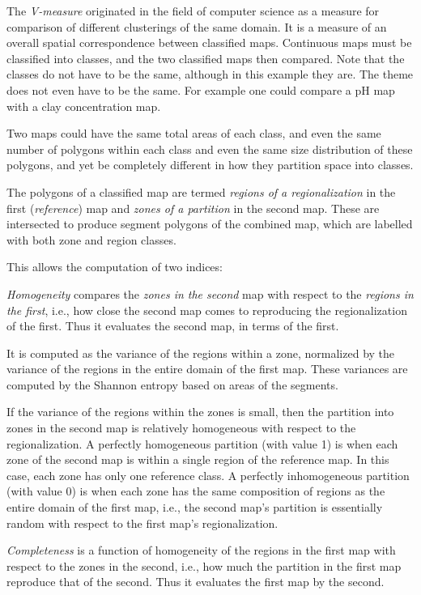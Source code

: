 \documentclass[
  letterpaper,
  DIV=11,
  numbers=noendperiod]{scrartcl}
\begin{document}
The \emph{V-measure} originated in the field of computer science as a
measure for comparison of different clusterings of the same domain. It
is a measure of an overall spatial correspondence between classified
maps. Continuous maps must be classified into classes, and the two
classified maps then compared. Note that the classes do not have to be
the same, although in this example they are. The theme does not even
have to be the same. For example one could compare a pH map with a clay
concentration map.

Two maps could have the same total areas of each class, and even the
same number of polygons within each class and even the same size
distribution of these polygons, and yet be completely different in how
they partition space into classes.

The polygons of a classified map are termed \emph{regions of a
regionalization} in the first (\emph{reference}) map and \emph{zones of
a partition} in the second map. These are intersected to produce segment
polygons of the combined map, which are labelled with both zone and
region classes.

This allows the computation of two indices:

\emph{Homogeneity} compares the \emph{zones in the second} map with
respect to the \emph{regions in the first}, i.e., how close the second
map comes to reproducing the regionalization of the first. Thus it
evaluates the second map, in terms of the first.

It is computed as the variance of the regions within a zone, normalized
by the variance of the regions in the entire domain of the first map.
These variances are computed by the Shannon entropy based on areas of
the segments.

If the variance of the regions within the zones is small, then the
partition into zones in the second map is relatively homogeneous with
respect to the regionalization. A perfectly homogeneous partition (with
value 1) is when each zone of the second map is within a single region
of the reference map. In this case, each zone has only one reference
class. A perfectly inhomogeneous partition (with value 0) is when each
zone has the same composition of regions as the entire domain of the
first map, i.e., the second map's partition is essentially random with
respect to the first map's regionalization.

\emph{Completeness} is a function of homogeneity of the regions in the
first map with respect to the zones in the second, i.e., how much the
partition in the first map reproduce that of the second. Thus it
evaluates the first map by the second.
\end{document}
